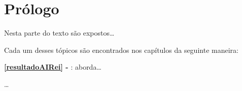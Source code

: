 \chapter*{Prólogo}

Nesta parte do texto são expostos\ldots

Cada um desses tópicos são encontrados nos capítulos da seguinte maneira:

\begin{list}{--}{} 

  \item \textbf{\autoref{resultadoAIRei} - }: aborda\ldots

  \item \ldots 
  
\end{list}